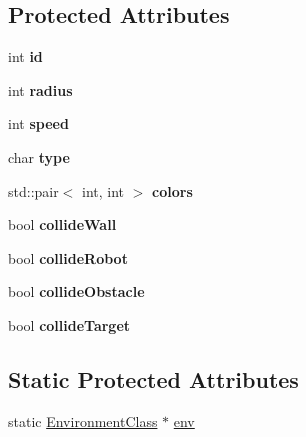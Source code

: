 \subsection*{Protected Attributes}
\begin{DoxyCompactItemize}
\item 
\hypertarget{classBaseObject_a7ef14013e26bcc16fcce2b24eb9c203b}{int {\bfseries id}}\label{classBaseObject_a7ef14013e26bcc16fcce2b24eb9c203b}

\item 
\hypertarget{classBaseObject_af8cf3d7c4c0659494f3079f955baff56}{int {\bfseries radius}}\label{classBaseObject_af8cf3d7c4c0659494f3079f955baff56}

\item 
\hypertarget{classBaseObject_a5c46de9fb6eb3e76907c53455e761404}{int {\bfseries speed}}\label{classBaseObject_a5c46de9fb6eb3e76907c53455e761404}

\item 
\hypertarget{classBaseObject_a236f85a689e1318bf08317bb9ad56a5f}{char {\bfseries type}}\label{classBaseObject_a236f85a689e1318bf08317bb9ad56a5f}

\item 
\hypertarget{classBaseObject_a1275060b29299d3505531bdbbec700cf}{std\-::pair$<$ int, int $>$ {\bfseries colors}}\label{classBaseObject_a1275060b29299d3505531bdbbec700cf}

\item 
\hypertarget{classBaseObject_a71f6964f87a246f3cc851dd5d39f2b19}{bool {\bfseries collide\-Wall}}\label{classBaseObject_a71f6964f87a246f3cc851dd5d39f2b19}

\item 
\hypertarget{classBaseObject_a432f0c339b906458a6bc4f92245ec8e9}{bool {\bfseries collide\-Robot}}\label{classBaseObject_a432f0c339b906458a6bc4f92245ec8e9}

\item 
\hypertarget{classBaseObject_afabf8245f1df23c23a8cce458dbde1ed}{bool {\bfseries collide\-Obstacle}}\label{classBaseObject_afabf8245f1df23c23a8cce458dbde1ed}

\item 
\hypertarget{classBaseObject_a7d16b780bd9d3f19b6ddac0909171afd}{bool {\bfseries collide\-Target}}\label{classBaseObject_a7d16b780bd9d3f19b6ddac0909171afd}

\end{DoxyCompactItemize}
\subsection*{Static Protected Attributes}
\begin{DoxyCompactItemize}
\item 
static \hyperlink{classEnvironment}{Environment\-Class} $\ast$ \hyperlink{classBaseObject_af064f06ff268b46d162c9aadf4604570}{env}
\end{DoxyCompactItemize}


